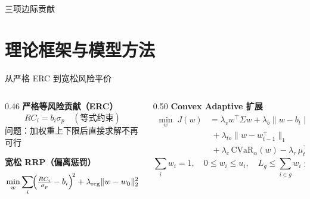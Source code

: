 \documentclass[aspectratio=169,11pt]{beamer}
\begin{document}
\begin{frame}{三项边际贡献}
  \begin{swufekeypoints}
  \end{swufekeypoints}
\end{frame}

\section{理论框架与模型方法}

\begin{frame}{从严格 ERC 到宽松风险平价}
  \begin{columns}[T]
    \begin{column}{0.46\textwidth}
      \textbf{严格等风险贡献（ERC）}
      \[
        RC_i = b_i \sigma_p \quad(\text{等式约束})
      \]
      \alert{问题}：加权重上下限后直接求解不再可行
      \vspace{0.8em}

      \textbf{宽松 RRP（偏离惩罚）}
      \[
        \min_w \sum_i \!\Bigl(\tfrac{RC_i}{\sigma_p} - b_i\Bigr)^{\!2}
        + \lambda_{\text{reg}}\|w-w_0\|_2^2
      \]
    \end{column}
    \begin{column}{0.50\textwidth}
      \textbf{Convex Adaptive 扩展}\\[0.3em]
      \small
      \begin{align*}
        \min_w\; J(w)
          &= \lambda_v w^\top\Sigma w
           + \lambda_b\|w - b_t\|_2^2 \\
          &\;+ \lambda_{to}\|w - w_{t-1}^+\|_1 \\
          &\;+ \lambda_c\,\mathrm{CVaR}_\alpha(w)
           - \lambda_r\,\mu_t^\top w
      \end{align*}
      \normalsize
      \[
        \textstyle\sum_i w_i=1,\quad 0\le w_i\le u_i,\quad
        L_g\le\textstyle\sum_{i\in g}w_i\le U_g
      \]
    \end{column}
  \end{columns}
\end{frame}
\end{document}
